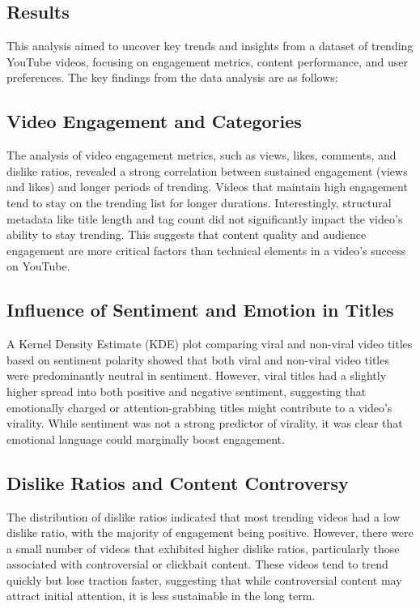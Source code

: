 \documentclass[a4paper]{article}
\begin{document}
\begin{multicols}{2} 


\section{Results}

This analysis aimed to uncover key trends and insights from a dataset of trending YouTube videos, focusing on engagement metrics, content performance, and user preferences. The key findings from the data analysis are as follows:

\subsection{Video Engagement and Categories}
The analysis of video engagement metrics, such as views, likes, comments, and dislike ratios, revealed a strong correlation between sustained engagement (views and likes) and longer periods of trending. Videos that maintain high engagement tend to stay on the trending list for longer durations. Interestingly, structural metadata like title length and tag count did not significantly impact the video’s ability to stay trending. This suggests that content quality and audience engagement are more critical factors than technical elements in a video’s success on YouTube.

\subsection{Influence of Sentiment and Emotion in Titles}
A Kernel Density Estimate (KDE) plot comparing viral and non-viral video titles based on sentiment polarity showed that both viral and non-viral video titles were predominantly neutral in sentiment. However, viral titles had a slightly higher spread into both positive and negative sentiment, suggesting that emotionally charged or attention-grabbing titles might contribute to a video’s virality. While sentiment was not a strong predictor of virality, it was clear that emotional language could marginally boost engagement.

\subsection{Dislike Ratios and Content Controversy}
The distribution of dislike ratios indicated that most trending videos had a low dislike ratio, with the majority of engagement being positive. However, there were a small number of videos that exhibited higher dislike ratios, particularly those associated with controversial or clickbait content. These videos tend to trend quickly but lose traction faster, suggesting that while controversial content may attract initial attention, it is less sustainable in the long term.


\end{multicols}
\end{document}
